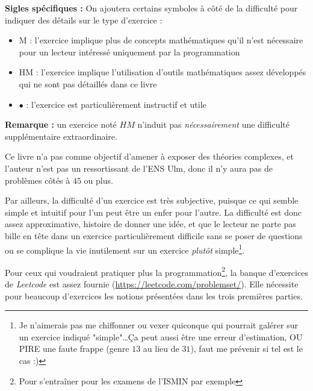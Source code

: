 \documentclass[../main.tex]{subfiles}
\begin{document}
\textbf{Sigles spécifiques :} On ajoutera certains symboles à côté de la difficulté pour indiquer des détails sur le type d'exercice :
\begin{itemize}
	\item M : l'exercice implique plus de concepts mathématiques qu'il n'est nécessaire pour un lecteur intéressé uniquement par la programmation
	\item HM : l'exercice implique l'utilisation d'outils mathématiques assez développés qui ne sont pas détaillés dans ce livre
	\item $\bullet$ : l'exercice est particulièrement instructif et utile
\end{itemize}
\textbf{Remarque :} un exercice noté $HM$ n'induit pas \textit{nécessairement} une difficulté supplémentaire extraordinaire.

Ce livre n'a pas comme objectif d'amener à exposer des théories complexes, et l'auteur n'est pas un ressortissant de l'ENS Ulm, donc il n'y aura pas de problèmes côtés à $45$ ou plus.

Par ailleurs, la difficulté d'un exercice est très subjective, puisque ce qui semble simple et intuitif pour l'un peut être un enfer pour l'autre. La difficulté est donc assez approximative, histoire de donner une idée, et que le lecteur ne parte pas bille en tête dans un exercice particulièrement difficile sans se poser de questions ou se complique la vie inutilement sur un exercice \textit{plutôt} simple\footnote{Je n'aimerais pas me chiffonner ou vexer quiconque qui pourrait galérer sur un exercice indiqué "simple"\dots Ça peut aussi être une erreur d'estimation, OU PIRE une faute frappe (genre $13$ au lieu de $31$), faut me prévenir si tel est le cas :)}.

Pour ceux qui voudraient pratiquer plus la programmation\footnote{Pour s'entraîner pour les examens de l'ISMIN par exemple}, la banque d'exercices de \textit{Leetcode} est assez fournie (\url{https://leetcode.com/problemset/}). Elle nécessite pour beaucoup d'exercices les notions présentées dans les trois premières parties.
\newpage
\end{document}
